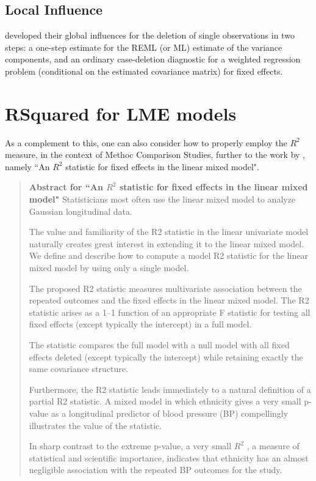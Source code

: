 \documentclass[12pt, a4paper]{report}
\theoremstyle{plain}
\theoremstyle{definition}
\theoremstyle{remark}
\begin{document}
\subsection{Local Influence}

\citet{Christensen} developed their global influences for the deletion of single observations in two steps: a one-step estimate for the REML (or ML) estimate of the variance components, and an ordinary case-deletion diagnostic for a weighted regression problem (conditional on the estimated covariance matrix) for fixed effects.


	

	\section{RSquared for LME models}
	
	As a complement to this, one can also consider how to properly employ the $R^2$ measure, in the context of Methoc Comparison Studies, further to the work by \citet{edwards2008}, namely ``An $R^2$ statistic for fixed effects in the linear mixed model".
	
	\begin{framed}
		
		\begin{quote}
			\textbf{Abstract for ``An $R^2$ statistic for fixed effects in the linear mixed model"}
			Statisticians most often use the linear mixed model to analyze Gaussian longitudinal data. 
			
			The value and familiarity of the R2 statistic in the linear univariate model naturally creates great interest in extending it to the linear mixed model. We define and describe how to compute a model R2 statistic for the linear mixed model by using only a single model. 
			
			The proposed R2 statistic measures multivariate association between the repeated outcomes and the fixed effects in the linear mixed model. The R2 statistic arises as a 1–1 function of an appropriate F statistic for testing all fixed effects (except typically the intercept) in a full model. 
			
			The statistic compares the full model with a null model with all fixed effects deleted (except typically the intercept) while retaining exactly the same covariance structure. 
			
			Furthermore, the R2 statistic leads immediately to a natural definition of a partial R2 statistic. A mixed model in which ethnicity gives a very small p-value as a longitudinal predictor of blood pressure (BP) compellingly illustrates the value of the statistic. 
			
			In sharp contrast to the extreme p-value, a very small $R^2$ , a measure of statistical and scientific importance, indicates that ethnicity has an almost negligible association with the repeated BP outcomes for the study.
		\end{quote}
	\end{framed}
	
\end{document}
